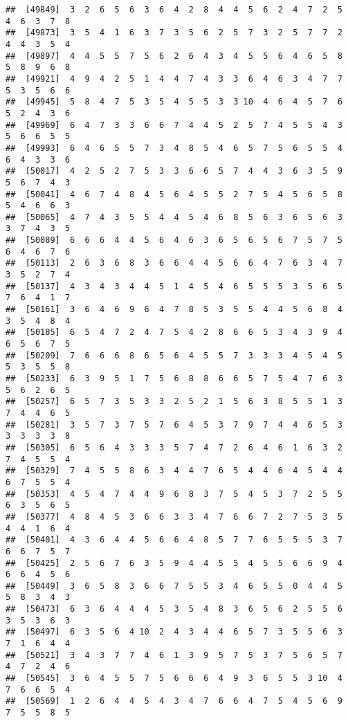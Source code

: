 \documentclass[
]{book}
\begin{document}
\begin{verbatim}
##  [49849]  3  2  6  5  6  3  6  4  2  8  4  4  5  6  2  4  7  2  5  4  6  3  7  8
##  [49873]  3  5  4  1  6  3  7  3  5  6  2  5  7  3  2  5  7  7  2  4  4  3  5  4
##  [49897]  4  4  5  5  7  5  6  2  6  4  3  4  5  5  6  4  6  5  8  5  8  9  6  8
##  [49921]  4  9  4  2  5  1  4  4  7  4  3  3  6  4  6  3  4  7  7  5  3  5  6  6
##  [49945]  5  8  4  7  5  3  5  4  5  5  3  3 10  4  6  4  5  7  6  5  2  4  3  6
##  [49969]  6  4  7  3  3  6  6  7  4  4  5  2  5  7  4  5  5  4  3  5  6  6  5  5
##  [49993]  6  4  6  5  5  7  3  4  8  5  4  6  5  7  5  6  5  5  4  6  4  3  3  6
##  [50017]  4  2  5  2  7  5  3  3  6  6  5  7  4  4  3  6  3  5  9  5  6  7  4  3
##  [50041]  4  6  7  4  8  4  5  6  4  5  5  2  7  5  4  5  6  5  8  5  4  6  6  3
##  [50065]  4  7  4  3  5  5  4  4  5  4  6  8  5  6  3  6  5  6  3  3  7  4  3  5
##  [50089]  6  6  6  4  4  5  6  4  6  3  6  5  6  5  6  7  5  7  5  6  4  6  7  6
##  [50113]  2  6  3  6  8  3  6  6  4  4  5  6  6  4  7  6  3  4  7  3  5  2  7  4
##  [50137]  4  3  4  3  4  4  5  1  4  5  4  6  5  5  5  3  5  6  5  7  6  4  1  7
##  [50161]  3  6  4  6  9  6  4  7  8  5  3  5  5  4  4  5  6  8  4  3  5  4  8  4
##  [50185]  6  5  4  7  2  4  7  5  4  2  8  6  6  5  3  4  3  9  4  6  5  6  7  5
##  [50209]  7  6  6  6  8  6  5  6  4  5  5  7  3  3  3  4  5  4  5  5  3  5  5  8
##  [50233]  6  3  9  5  1  7  5  6  8  8  6  6  5  7  5  4  7  6  3  5  6  2  6  5
##  [50257]  6  5  7  3  5  3  3  2  5  2  1  5  6  3  8  5  5  1  3  7  4  4  6  5
##  [50281]  3  5  7  3  7  5  7  6  4  5  3  7  9  7  4  4  6  5  3  3  3  3  3  8
##  [50305]  6  5  6  4  3  3  3  5  7  4  7  2  6  4  6  1  6  3  2  7  4  5  5  4
##  [50329]  7  4  5  5  8  6  3  4  4  7  6  5  4  4  6  4  5  4  4  6  7  5  5  4
##  [50353]  4  5  4  7  4  4  9  6  8  3  7  5  4  5  3  7  2  5  5  6  3  5  6  5
##  [50377]  4  8  4  5  3  6  6  3  3  4  7  6  6  7  2  7  5  3  5  4  4  1  6  4
##  [50401]  4  3  6  4  4  5  6  6  4  8  5  7  7  6  5  5  5  3  7  6  6  7  5  7
##  [50425]  2  5  6  7  6  3  5  9  4  4  5  5  4  5  5  6  6  9  4  6  6  4  5  6
##  [50449]  3  6  5  8  3  6  6  7  5  5  3  4  6  5  5  0  4  4  5  5  8  3  4  3
##  [50473]  6  3  6  4  4  4  5  3  5  4  8  3  6  5  6  2  5  5  6  3  5  3  6  3
##  [50497]  6  3  5  6  4 10  2  4  3  4  4  6  5  7  3  5  5  6  3  7  1  6  4  4
##  [50521]  3  4  3  7  7  4  6  1  3  9  5  7  5  3  7  5  6  5  7  4  7  2  4  6
##  [50545]  3  6  4  5  5  7  5  6  6  6  4  9  3  6  5  5  3 10  4  7  6  6  5  4
##  [50569]  1  2  6  4  4  5  4  3  4  7  6  6  4  7  5  4  5  6  9  7  5  5  8  5

\end{verbatim}
\end{document}
